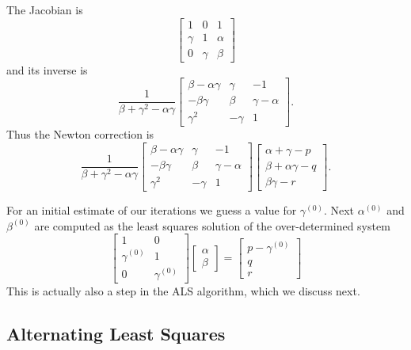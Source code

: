 \documentclass[
  12pt,
]{article}
\begin{document}
The Jacobian is
\[
\begin{bmatrix}
1&0&1\\
\gamma&1&\alpha\\
0&\gamma&\beta
\end{bmatrix}
\]
and its inverse is
\[
\frac{1}{\beta+\gamma^2-\alpha\gamma}
\begin{bmatrix}
\beta-\alpha\gamma&\gamma&-1\\
-\beta\gamma&\beta&\gamma-\alpha\\
\gamma^2&-\gamma&1
\end{bmatrix}.
\]
Thus the Newton correction is
\[
\frac{1}{\beta+\gamma^2-\alpha\gamma}
\begin{bmatrix}
\beta-\alpha\gamma&\gamma&-1\\
-\beta\gamma&\beta&\gamma-\alpha\\
\gamma^2&-\gamma&1
\end{bmatrix}
\begin{bmatrix}
\alpha+\gamma-p\\
\beta+\alpha\gamma-q\\
\beta\gamma-r
\end{bmatrix}.
\]

For an initial estimate of our iterations we guess a value for \(\gamma^{(0)}\). Next \(\alpha^{(0)}\) and \(\beta^{(0)}\) are computed as the least squares solution of the over-determined system
\[
\begin{bmatrix}
1&0\\
\gamma^{(0)}&1\\
0&\gamma^{(0)}
\end{bmatrix}
\begin{bmatrix}\alpha\\\beta\end{bmatrix}
=\begin{bmatrix}p-\gamma^{(0)}\\q\\r\end{bmatrix}
\]
This is actually also a step in the ALS algorithm, which we discuss next.

\subsection{Alternating Least Squares}\label{alternating-least-squares}
\end{document}
